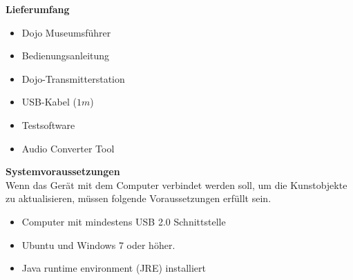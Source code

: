 \textbf{Lieferumfang}

\begin{itemize}
\item Dojo Museumsführer
\end{itemize}
\begin{itemize}
\item Bedienungsanleitung
\end{itemize}
\begin{itemize}
\item Dojo-Transmitterstation
\end{itemize}
\begin{itemize}
\item USB-Kabel ($1m$)
\end{itemize}
\begin{itemize}
\item Testsoftware
\end{itemize}
\begin{itemize}
\item Audio Converter Tool
\end{itemize}
\textbf{Systemvoraussetzungen}
\\[4mm]
Wenn das Gerät mit dem Computer verbindet werden soll, um die Kunstobjekte zu aktualisieren, müssen folgende Voraussetzungen erfüllt sein.
\begin{itemize}
\item Computer mit mindestens USB 2.0 Schnittstelle
\end{itemize}
\begin{itemize}
\item Ubuntu und Windows 7 oder höher.
\end{itemize}
\begin{itemize}
\item Java runtime environment (JRE) installiert
\end{itemize}